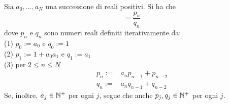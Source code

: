 \begin{thm}\label{thm:Cont_frac_convergents}
 Sia $a_0,\dots, a_N$ una successione di reali positivi. Si ha che
 \begin{equation}
  [a_0;a_1,\dots,a_n] = \frac{p_n}{q_n}
 \end{equation}
 dove $p_n$ e $q_n$ sono numeri reali definiti iterativamente da:\\
 (1) $p_0 := a_0$ e $q_0:=1$\\
 (2) $p_1 := 1 + a_0a_1$ e $q_1:=a_1$\\
 (3) per $2 \leq n \leq N$
 \begin{align}
  p_n :=& a_np_{n-1} + p_{n-2}\\
  q_n :=& a_nq_{n-1} + q_{n-2}
 \end{align}
 Se, inoltre, $a_j \in \mathbb{N}^+$ per ogni $j$, segue che anche $p_j, q_j \in \mathbb{N}^+$ per ogni $j$. 
\end{thm}
